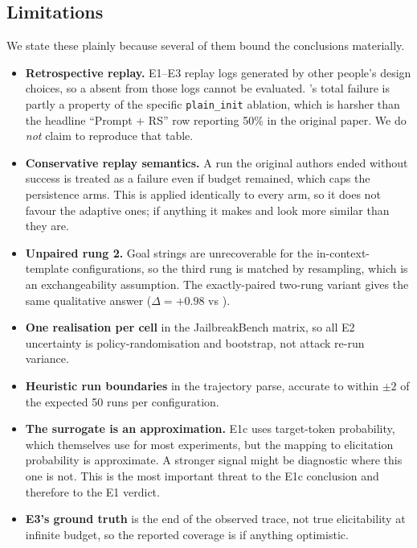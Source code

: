 \subsection{Limitations}

We state these plainly because several of them bound the conclusions materially.

\begin{itemize}[leftmargin=*,itemsep=1pt,topsep=2pt]
    \item \textbf{Retrospective replay.} E1--E3 replay logs generated by other people's design
    choices, so a \family absent from those logs cannot be evaluated. \staticzero's total failure
    is partly a property of the specific \texttt{plain\_init} ablation, which is harsher than the
    headline ``Prompt + RS'' row reporting 50\% in the original paper. We do \emph{not} claim to
    reproduce that table.
    \item \textbf{Conservative replay semantics.} A run the original authors ended without success
    is treated as a failure even if budget remained, which caps the persistence arms. This is
    applied identically to every arm, so it does not favour the adaptive ones; if anything it makes
    \fixedsplit and \ladder look more similar than they are.
    \item \textbf{Unpaired rung 2.} Goal strings are unrecoverable for the in-context-template
    configurations, so the third rung is matched by resampling, which is an exchangeability
    assumption. The exactly-paired two-rung variant gives the same qualitative answer
    ($\Delta = +0.98$ vs \staticzero).
    \item \textbf{One realisation per cell} in the JailbreakBench matrix, so all E2 uncertainty is
    policy-randomisation and bootstrap, not attack re-run variance.
    \item \textbf{Heuristic run boundaries} in the trajectory parse, accurate to within $\pm 2$ of
    the expected 50 runs per configuration.
    \item \textbf{The surrogate is an approximation.} E1c uses target-token probability, which
    \citet{jones2025forecasting} themselves use for most experiments, but the mapping to elicitation
    probability is approximate. A stronger signal might be diagnostic where this one is not. This is
    the most important threat to the E1c conclusion and therefore to the E1 verdict.
    \item \textbf{E3's ground truth} is the end of the observed trace, not true elicitability at
    infinite budget, so the reported coverage is if anything optimistic.

\end{itemize}
